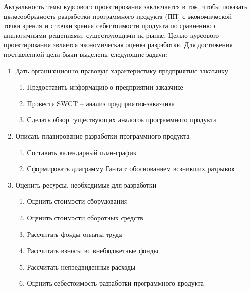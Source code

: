 
\mainText
Актуальность темы курсового проектирования заключается в том, чтобы показать целесообразность разработки программного продукта (ПП) с экономической точки зрения и с точки зрения себестоимости продукта по сравнению с аналогичными решениями, существующими на рынке.
Целью курсового проектирования является экономическая оценка разработки.
Для достижения поставленной цели были выделены следующие задачи:
\gostEnumPriority
\begin{enumerate}
	\gostEnumPriority
	\item 	Дать организационно-правовую характеристику предприятию-заказчику
	\begin{enumerate}
		\gostEnumPriority
		\item Предоставить информацию о предприятии-заказчике
		\item Провести SWOT – анализ предприятия-заказчика
		\item Сделать обзор существующих аналогов программного продукта
	\end{enumerate}
	\gostEnumPriority 
	\item Описать планирование разработки программного продукта
	\begin{enumerate}
		\gostEnumPriority
		\item Составить календарный план-график
		\item Сформировать диаграмму Ганта с обоснованием возникших разрывов
	\end{enumerate}
	\item Оценить ресурсы, необходимые для разработки
	\begin{enumerate}
		\gostEnumPriority
		\item Оценить стоимости оборудования
		\item Оценить стоимости оборотных средств
		\item Рассчитать фонды оплаты труда
		\item Рассчитать взносы во внебюджетные фонды
		\item Рассчитать непредвиденные расходы
		\item Оценить себестоимость разработки программного продукта
	\end{enumerate}
\end{enumerate}

